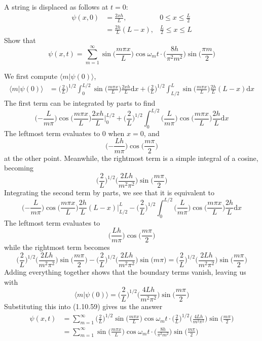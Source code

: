 \documentclass[../principles-of-quantum-mechanics.tex]{subfiles}
\begin{document}
\begin{questions}
\question A string is displaced as follows at $t = 0$:
\begin{align*}
	\psi(x, 0) &= \frac{2xh}{L},  &0 \leq x \leq \frac{L}{2} \\
	&= \frac{2h}{L}(L - x), &\frac{L}{2} \leq x \leq L
\end{align*}
Show that
\[
	\psi(x, t) = \sum_{m=1}^{\infty}\sin\Big(\frac{m\pi{x}}{L}\Big)\cos\omega_mt\cdot\Big(\frac{8h}{\pi^2m^2}\Big)\sin\Big(\frac{\pi m}{2}\Big)
\]

\begin{solution}
	We first compute $\langle m|\psi(0)\rangle$,
	\begin{align*}
		\langle m|\psi(0)\rangle &= \Big(\frac{2}{L}\Big)^{1/2}\int_0^{L/2}\sin\Big(\frac{m\pi{x}}{L}\Big)\frac{2xh}{L}\mathrm{d}x + \Big(\frac{2}{L}\Big)^{1/2}\int_{L/2}^{L}\sin\Big(\frac{m\pi{x}}{L}\Big)\frac{2h}{L}(L-x)\mathrm{d}x
	\end{align*}
	The first term can be integrated by parts to find
	\[
	\Big({-\frac{L}{m\pi}}\Big)\cos\Big(\frac{m\pi{x}}{L}\Big)\frac{2xh}{L}\Big|_{0}^{L/2} +  \Big(\frac{2}{L}\Big)^{1/2}\int_0^{L/2}\Big({\frac{L}{m\pi}}\Big)\cos\Big(\frac{m\pi{x}}{L}\Big)\frac{2h}{L}\mathrm{d}x
	\]
	The leftmost term evaluates to $0$ when $x = 0$, and
	\[
		\Big({-\frac{Lh}{m\pi}}\Big)\cos\Big(\frac{m\pi}{2}\Big)
	\]
	at the other point. Meanwhile, the rightmost term is a simple integral of a cosine, becoming
	\[
		\Big(\frac{2}{L}\Big)^{1/2}\Big(\frac{2Lh}{m^2\pi^2}\Big)\sin\Big(\frac{m\pi}{2}\Big)
	\]
	Integrating the second term by parts, we see that it is equivalent to
	\[
	\Big({-\frac{L}{m\pi}}\Big)\cos\Big(\frac{m\pi{x}}{L}\Big)\frac{2h}{L}(L-x)\Big|_{L/2}^{L} -  \Big(\frac{2}{L}\Big)^{1/2}\int_0^{L/2}\Big({\frac{L}{m\pi}}\Big)\cos\Big(\frac{m\pi{x}}{L}\Big)\frac{2h}{L}\mathrm{d}x
	\]
	The leftmost term evaluates to
	\[
		\Big({\frac{Lh}{m\pi}}\Big)\cos\Big(\frac{m\pi}{2}\Big)
	\]
	while the rightmost term becomes
	\[
		\Big(\frac{2}{L}\Big)^{1/2}\Big(\frac{2Lh}{m^2\pi^2}\Big)\sin\Big(\frac{m\pi}{2}\Big) - \Big(\frac{2}{L}\Big)^{1/2}\Big(\frac{2Lh}{m^2\pi^2}\Big)\sin\Big(m\pi\Big) = \Big(\frac{2}{L}\Big)^{1/2}\Big(\frac{2Lh}{m^2\pi^2}\Big)\sin\Big(\frac{m\pi}{2}\Big)
	\]
	Adding everything together shows that the boundary terms vanish, leaving us with
	\[
		\langle{m}|\psi(0)\rangle = \Big(\frac{2}{L}\Big)^{1/2}\Big(\frac{4Lh}{m^2\pi^2}\Big)\sin\Big(\frac{m\pi}{2}\Big)
	\]
	Substituting this into (1.10.59) gives us the answer
	\begin{align*}
		\psi(x, t) &= \sum_{m=1}^{\infty}\Big(\frac{2}{L}\Big)^{1/2}\sin\Big(\frac{m\pi{x}}{L}\Big)\cos \omega_mt\cdot\Big(\frac{2}{L}\Big)^{1/2}\Big(\frac{4Lh}{m^2\pi^2}\Big)\sin\Big(\frac{m\pi}{2}\Big) \\
		&= \sum_{m=1}^{\infty}\sin\Big(\frac{m\pi{x}}{L}\Big)\cos\omega_mt\cdot\Big(\frac{8h}{\pi^2m^2}\Big)\sin\Big(\frac{m\pi}{2}\Big)
	\end{align*}
\end{solution}

\end{questions}
\end{document}
